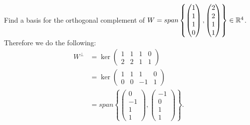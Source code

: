 \begin{exmp}
	Find a basis for the orthogonal complement of
	$W=span \left\{
		\begin{pmatrix} 1\\1\\1\\0 \end{pmatrix}
		,
		\begin{pmatrix} 2\\2\\1\\1 \end{pmatrix}
	\right\} \in \mathbb{R}^4$.
	Therefore we do the following:
	\begin{align*}
		W^{\perp} &= \ker
		\begin{pmatrix}
			1 & 1 & 1 & 0 \\
			2 & 2 & 1 & 1
		\end{pmatrix}
		\\
		&= \ker
		\begin{pmatrix}
			1 & 1 & 1 & 0 \\
			0 & 0 & -1 & 1
		\end{pmatrix}
		\tag{after a row reduction}
		\\
		&= span \left\{
			\begin{pmatrix} 0\\-1\\1\\1 \end{pmatrix}
			,
			\begin{pmatrix} -1\\0\\1\\1 \end{pmatrix}
		\right\}.
	\end{align*}
\end{exmp}
